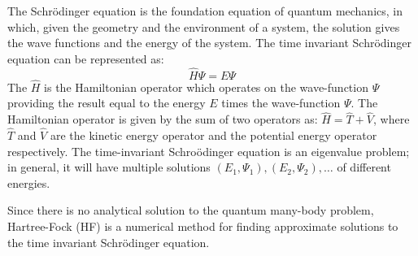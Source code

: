 \documentclass[twoside,11pt]{article}
\begin{document}
The Schr\"{o}dinger equation is the foundation equation of quantum mechanics, in which, given the geometry and the environment of a system, the solution gives the wave functions and the energy of the system. 
The time invariant Schr\"{o}dinger equation can be represented as:
\[
				\hat{H}\Psi = E\Psi
\]
The $\hat{H}$ is the Hamiltonian operator which operates on the wave-function $\Psi$ providing the result equal to the energy $E$ times the wave-function $\Psi$. The Hamiltonian operator is given by the sum of two operators as: $\hat{H} = \hat{T} + \hat{V}$,  where $\hat{T}$ and $\hat{V}$ are the kinetic energy operator and the potential energy operator respectively. 
The time-invariant Schro\"{o}dinger equation is an eigenvalue problem; in general, it will have multiple solutions $(E_1, \Psi_1), (E_2,\Psi_2), \ldots$ of different energies.  





Since there is no analytical solution to the quantum many-body problem, Hartree-Fock (HF) is a numerical method for finding approximate solutions to the time invariant Schr\"{o}dinger equation. 







\end{document}
